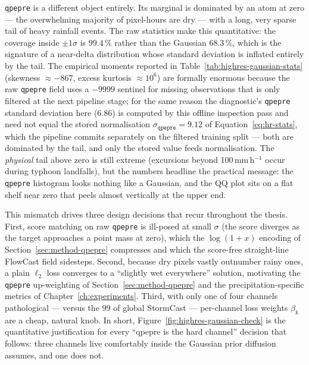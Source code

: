 \texttt{qpepre} is a different object entirely. Its marginal is dominated by an atom at zero --- the overwhelming majority of pixel-hours are dry --- with a long, very sparse tail of heavy rainfall events. The raw statistics make this quantitative: the coverage inside $\pm 1\sigma$ is $99.4\,\%$ rather than the Gaussian $68.3\,\%$, which is the signature of a near-delta distribution whose standard deviation is inflated entirely by the tail. The empirical moments reported in Table~\ref{tab:highres-gaussian-stats} (skewness $\approx -867$, excess kurtosis $\approx 10^{6}$) are formally enormous because the raw \texttt{qpepre} field uses a $-9999$ sentinel for missing observations that is only filtered at the next pipeline stage; for the same reason the diagnostic's \texttt{qpepre} standard deviation here ($6.86$) is computed by this offline inspection pass and need not equal the stored normalisation $\sigma_{\texttt{qpepre}} = 9.12$ of Equation~\ref{eq:hr-stats}, which the pipeline commits separately on the filtered training split --- both are dominated by the tail, and only the stored value feeds normalisation. The \emph{physical} tail above zero is still extreme (excursions beyond 100\,mm\,h$^{-1}$ occur during typhoon landfalls), but the numbers headline the practical message: the \texttt{qpepre} histogram looks nothing like a Gaussian, and the QQ plot sits on a flat shelf near zero that peels almost vertically at the upper end.

This mismatch drives three design decisions that recur throughout the thesis. First, score matching on raw \texttt{qpepre} is ill-posed at small $\sigma$ (the score diverges as the target approaches a point mass at zero), which the $\log(1+x)$ encoding of Section~\ref{sec:method-qpepre} compresses and which the score-free straight-line FlowCast field sidesteps. Second, because dry pixels vastly outnumber rainy ones, a plain $\ell_2$ loss converges to a ``slightly wet everywhere'' solution, motivating the \texttt{qpepre} up-weighting of Section~\ref{sec:method-qpepre} and the precipitation-specific metrics of Chapter~\ref{ch:experiments}. Third, with only one of four channels pathological --- versus the 99 of global StormCast --- per-channel loss weights $\beta_k$ are a cheap, natural knob. In short, Figure~\ref{fig:highres-gaussian-check} is the quantitative justification for every ``qpepre is the hard channel'' decision that follows: three channels live comfortably inside the Gaussian prior diffusion assumes, and one does not.

